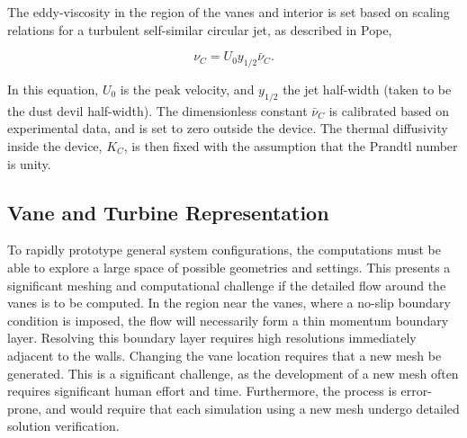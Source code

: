The eddy-viscosity in the region of the vanes and interior is set based
on scaling relations for a turbulent self-similar circular jet, as
described in Pope\cite{pope2000turbulent},
 
\begin{equation}
  \nu_C = U_0 y_{1/2} \bar \nu_C.
\end{equation}

In this equation, $U_0$ is the peak velocity, and $y_{1/2}$ the jet
half-width (taken to be the dust devil half-width).  
The dimensionless constant $\bar \nu_C $ is calibrated based on
experimental data, and is set to zero outside the device. 
The thermal diffusivity inside the device, $K_C$, is then fixed with the 
assumption that the Prandtl number is unity.  




\subsection{Vane and Turbine Representation}
\label{subsec:vane}
To rapidly prototype general system configurations, the
computations must be able to explore a large space of possible
geometries and settings. This presents a significant meshing and 
computational challenge if the detailed flow around the vanes is to be
computed. In the region near the vanes, where a no-slip boundary
condition is imposed, the flow will necessarily form a thin momentum
boundary layer. Resolving this boundary layer requires high resolutions
immediately adjacent to the walls. Changing the vane location requires
that a new mesh be generated.
This is a significant
challenge, as the development of a new mesh often requires significant
human effort and time. Furthermore, the process is error-prone, 
and would require that each simulation using a new mesh undergo 
detailed solution verification. 



